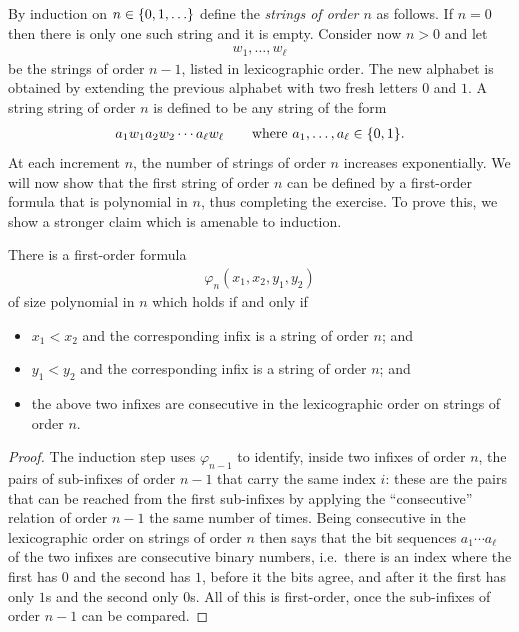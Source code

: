 {
By induction on  $n \in \{0,1,\ldots\}$ define the \emph{strings of order $n$} as follows. If $n=0$ then there is only one such string and it is empty. Consider now $n>0$ and let 
    \begin{align*}
    w_1,\ldots,w_\ell
    \end{align*}
    be the strings of order $n-1$, listed in lexicographic order.  The new alphabet is obtained by extending the previous alphabet with two fresh letters $0$ and $1$. A string  string of order $n$ is defined to be any string of the form 
    \begin{align*}
    a_1 w_1 a_2 w_2 \cdots a_\ell w_\ell  \qquad \text{where $a_1,\ldots,a_\ell \in \{0,1\}$}.
    \end{align*}
    At each increment $n$, the number of strings of order $n$ increases exponentially. We will now show that the first string of order $n$ can be defined by a first-order formula that is polynomial in $n$, thus completing the exercise. To prove this, we show a stronger claim which is amenable to induction. 
    \begin{claim}
        There is a first-order formula 
        \begin{align*}
            \varphi_n(x_1,x_2,y_1,y_2)
        \end{align*}
        of size polynomial in $n$ which holds if and only if
        \begin{itemize}
            \item $x_1 < x_2$ and the corresponding infix is a string of order $n$; and 
            \item $y_1 < y_2$ and the corresponding infix is a string of order $n$; and
            \item the  above two infixes  are consecutive in the lexicographic order on strings of order $n$.
        \end{itemize}
    \end{claim}
    \begin{proof}
        The induction step uses $\varphi_{n-1}$ to identify, inside two infixes of order $n$, the pairs of sub-infixes of order $n-1$ that carry the same index $i$: these are the pairs that can be reached from the first sub-infixes by applying the ``consecutive'' relation of order $n-1$ the same number of times. Being consecutive in the lexicographic order on strings of order $n$ then says that the bit sequences $a_1 \cdots a_\ell$ of the two infixes are consecutive binary numbers, i.e.~there is an index where the first has $0$ and the second has $1$, before it the bits agree, and after it the first has only $1$s and the second only $0$s. All of this is first-order, once the sub-infixes of order $n-1$ can be compared.


\end{proof}}
